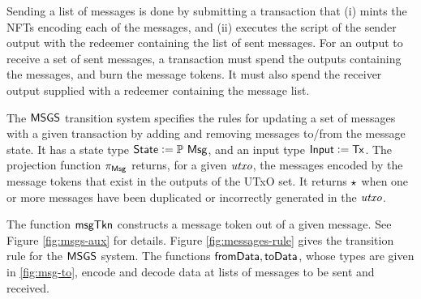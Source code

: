 Sending a list of messages is done by submitting a transaction that (i) mints the
NFTs encoding each of the messages, and (ii) executes the script of the sender
output with the redeemer containing the list of sent messages.
For an output to receive a set of sent messages, a transaction must spend the outputs containing the
messages, and burn the message tokens. It must also spend the receiver output
supplied with a redeemer containing the message list.

The $\mathsf{MSGS}$ transition system specifies the rules for updating a set of
messages with a given transaction by adding and removing messages to/from
the message state.
It has a state type $\mathsf{State} \mathrel{\mathop:}= \mathbb{P}~\mathsf{Msg}$, and
an input type $\textsf{Input} \mathrel{\mathop:}= \mathsf{Tx}$. The projection function
$\pi_{\mathsf{Msg}}$ returns, for a given $\mathit{utxo}$, the messages encoded by
the message tokens that exist in the outputs of the UTxO set. It
returns $\star$ when one or more messages have been duplicated or incorrectly
generated in the $\mathit{utxo}$.

The function $\mathsf{msgTkn}$ constructs a message token out of a given message.
See Figure \ref{fig:msgs-aux} for details.
Figure \ref{fig:messages-rule} gives the transition rule for the $\mathsf{MSGS}$
system. The functions $\mathsf{fromData}, \mathsf{toData}$, whose types are
given in \ref{fig:msg-to}, encode and decode data at lists of messages to be
sent and received.


